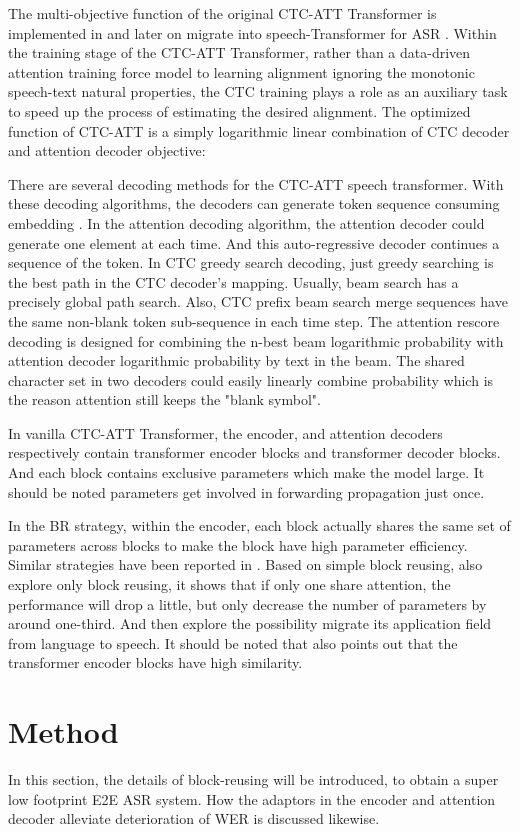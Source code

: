 \documentclass{INTERSPEECH2023}
\begin{document}
The multi-objective function of the original CTC-ATT Transformer is implemented in \cite{watanabe2017hybrid} and later on migrate into speech-Transformer for ASR \cite{nakatani2019improving}. Within the training stage of the CTC-ATT Transformer, rather than a data-driven attention training force model to learning alignment ignoring the monotonic speech-text natural properties, the CTC training plays a role as an auxiliary task to speed up the process of estimating the desired alignment. The optimized function of CTC-ATT is a simply logarithmic linear combination of CTC decoder and attention decoder objective:


There are several decoding methods for the CTC-ATT speech transformer. With these decoding algorithms, the decoders can generate token sequence  consuming embedding . In the attention decoding algorithm, the attention decoder could generate one element at each time. And this auto-regressive decoder continues a sequence of the token. In CTC greedy search decoding, just greedy searching is the best path in the CTC decoder's mapping. Usually, beam search has a precisely global path search.  Also, CTC prefix beam search merge sequences have the same non-blank token sub-sequence in each time step. The attention rescore decoding is designed for combining the n-best beam logarithmic probability with attention decoder logarithmic probability by text in the beam. The shared character set  in two decoders could easily linearly combine probability which is the reason attention still keeps the "blank symbol".


In vanilla CTC-ATT Transformer, the encoder, and attention decoders respectively contain  transformer encoder blocks and  transformer decoder blocks. And each block contains exclusive parameters which make the model large. It should be noted parameters get involved in forwarding propagation just once. 


In the BR strategy, within the encoder, each block actually shares the same set of parameters across blocks to make the block have high parameter efficiency. Similar strategies have been reported in \cite{dehghani2018universal}. Based on simple block reusing,  \cite{lan2019albert} also explore only block reusing, it shows that if only one share attention, the performance will drop a little, but only decrease the number of parameters by around one-third. And then \cite{gao2021extremely} explore the possibility migrate its application field from language to speech. It should be noted that \cite{zhao2021non} also points out that the transformer encoder blocks have high similarity.  \section{Method} \label{sec:Method}
In this section, the details of block-reusing will be introduced, to obtain a super low footprint E2E ASR system. How the adaptors in the encoder and attention decoder alleviate deterioration of WER is discussed likewise.
\end{document}
